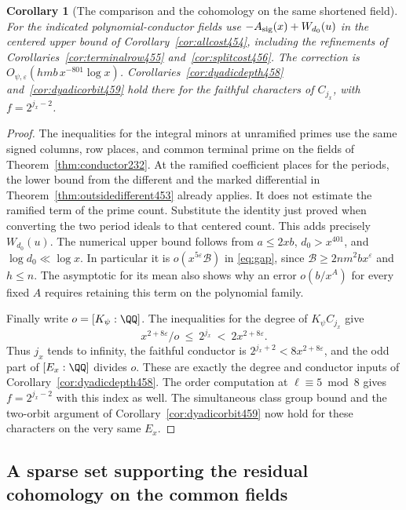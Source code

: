 \documentclass[a4paper,11pt]{article}
\newtheorem{corollary}[proposition]{Corollary}
\theoremstyle{definition}
\theoremstyle{remark}
\numberwithin{equation}{section}
\begin{document}
\begin{corollary}[The comparison and the cohomology on the same shortened field]\leavevmode
\label{cor:shortcenter460}
For the indicated polynomial-conductor fields use
\(-A_{\rm sig}(x)+W_{d_0}(u)\) in the centered upper bound of
Corollary~\ref{cor:allcost454}, including the refinements of
Corollaries~\ref{cor:terminalrow455} and~\ref{cor:splitcost456}.
The correction is \(O_{\psi,\varepsilon}(hmb\,x^{-801}\log x)\).
Corollaries~\ref{cor:dyadicdepth458} and~\ref{cor:dyadicorbit459}
hold there for the faithful characters of \(C_{j_x}\), with
\(f=2^{j_x-2}\).
\end{corollary}
\begin{proof}
The inequalities for the integral minors at unramified primes
use the same signed columns, row places, and common terminal
prime on the fields of Theorem~\ref{thm:conductor232}. At the
ramified coefficient places for the periods, the lower bound
from the different and the marked differential in
Theorem~\ref{thm:outsidedifferent453} already applies. It does
not estimate the ramified term of the prime count. Substitute
the identity just proved when converting the two period ideals
to that centered count. This adds precisely \(W_{d_0}(u)\).
The numerical upper bound follows from \(a\le2xb\),
\(d_0>x^{401}\), and \(\log d_0\ll\log x\). In particular it
is \(o(x^{5\varepsilon}\mathcal B)\) in \eqref{eq:gap}, since
\(\mathcal B\ge2nm^2b x^\varepsilon\) and \(h\le n\).
The asymptotic for its mean also shows why an error
\(o(b/x^A)\) for every fixed \(A\) requires retaining this
term on the polynomial family.

Finally write \(o=[K_\psi:\QQ]\). The inequalities for the
degree of \(K_\psi C_{j_x}\) give
\[
     x^{2+8\varepsilon}/o\ \le\ 2^{j_x}
                             \ <\ 2x^{2+8\varepsilon}.
\]
Thus \(j_x\) tends to infinity, the faithful conductor is
\(2^{j_x+2}<8x^{2+8\varepsilon}\), and the odd part of
\([E_x:\QQ]\) divides \(o\). These are exactly the degree and
conductor inputs of Corollary~\ref{cor:dyadicdepth458}.
The order computation at \(\ell\equiv5\bmod8\) gives
\(f=2^{j_x-2}\) with this index as well. The simultaneous
class group bound and the two-orbit argument of
Corollary~\ref{cor:dyadicorbit459} now hold for these characters
on the very same \(E_x\).
\end{proof}


\subsection{A sparse set supporting the residual cohomology on the common fields}
\label{sec:shiftedsupport465}
\end{document}
